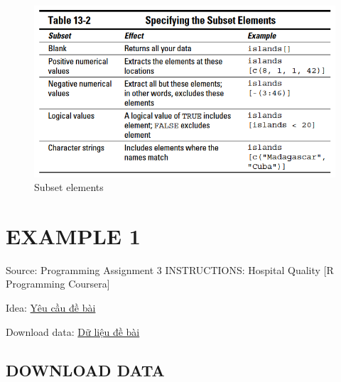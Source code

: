 \documentclass[
]{book}
\theoremstyle{definition}
\theoremstyle{definition}
\theoremstyle{definition}
\theoremstyle{definition}
\theoremstyle{remark}
\begin{document}
\begin{figure}
\centering
\includegraphics{images/subset1.png}
\caption{Subset elements}
\end{figure}

\hypertarget{example-1}{%
\chapter{EXAMPLE 1}\label{example-1}}

Source: Programming Assignment 3 INSTRUCTIONS: Hospital Quality {[}R Programming Coursera{]}

Idea: \href{https://tanduc307.github.io/xstk/example/1/idea_rprog_data_ProgAssignment3-data.pdf}{Yêu cầu đề bài}

Download data: \href{https://tanduc307.github.io/xstk/example/1/rprog_data_ProgAssignment3-data.zip}{Dữ liệu đề bài}

\hypertarget{download-data}{%
\section{DOWNLOAD DATA}\label{download-data}}
\end{document}

